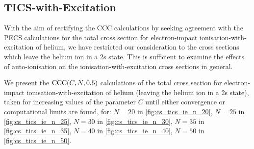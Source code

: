 \documentclass[]{article}
\begin{document}
%     

%     

\clearpage

\subsection{TICS-with-Excitation}
\label{sec:re-tics-ie}


With the aim of rectifying the CCC calculations by seeking agreement with the
PECS calculations \cite{PhysRevA.81.022716} for the total cross section for
electron-impact ionisation-with-excitation of helium, we have restricted our
consideration to the cross sections which leave the helium ion in a 2s state.
This is sufficient to examine the effects of auto-ionisation on the
ionisation-with-excitation cross sections in general.

We present the $\mathrm{CCC}(C, N, 0.5)$ calculations of the total cross
section for electron-impact ionisation-with-excitation of helium (leaving the
helium ion in a 2s state), taken for increasing values of the parameter $C$
until either convergence or computational limits are found, for:
$N = 20$ in \autoref{fig:cs_tics_ie_n_20},
$N = 25$ in \autoref{fig:cs_tics_ie_n_25},
$N = 30$ in \autoref{fig:cs_tics_ie_n_30},
$N = 35$ in \autoref{fig:cs_tics_ie_n_35},
$N = 40$ in \autoref{fig:cs_tics_ie_n_40},
$N = 50$ in \autoref{fig:cs_tics_ie_n_50}.
\end{document}
